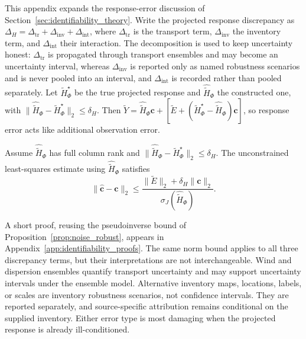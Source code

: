 This appendix expands the response-error discussion of
Section~\ref{sec:identifiability_theory}.  Write the projected
response discrepancy as
\(\Delta_H=\Delta_{\mathrm{tr}}+\Delta_{\mathrm{inv}}+\Delta_{\mathrm{int}}\),
where \(\Delta_{\mathrm{tr}}\) is the transport term, \(\Delta_{\mathrm{inv}}\)
the inventory term, and \(\Delta_{\mathrm{int}}\) their interaction.  The
decomposition is used to keep uncertainty honest: \(\Delta_{\mathrm{tr}}\) is
propagated through transport ensembles and may become an uncertainty interval,
whereas \(\Delta_{\mathrm{inv}}\) is reported only as named robustness scenarios
and is never pooled into an interval, and \(\Delta_{\mathrm{int}}\) is recorded
rather than pooled separately.  Let \(\widetilde H_\Phi^\star\) be the true
projected response and \(\widehat{\widetilde H}_\Phi\) the constructed one, with
\(\|\widehat{\widetilde H}_\Phi-\widetilde H_\Phi^\star\|_2\le\delta_H\).  Then
\(\widetilde Y=\widehat{\widetilde H}_\Phi\mathbf c
+[\widetilde E+(\widetilde H_\Phi^\star-\widehat{\widetilde H}_\Phi)\mathbf c]\),
so response error acts like additional observation error.

\begin{proposition}
\label{prop:operator_perturbation}
Assume \(\widehat{\widetilde H}_\Phi\) has full column rank and
\(\|\widehat{\widetilde H}_\Phi-\widetilde H_\Phi^\star\|_2\le\delta_H\).
The unconstrained least-squares estimate using
\(\widehat{\widetilde H}_\Phi\) satisfies
\begin{equation}
\|\widehat{\mathbf c}-\mathbf c\|_2
\le
\frac{\|\widetilde E\|_2+\delta_H\|\mathbf c\|_2}
{\sigma_J(\widehat{\widetilde H}_\Phi)}.
\label{eq:operator_error_bound}
\end{equation}
\end{proposition}

A short proof, reusing the pseudoinverse bound of
Proposition~\ref{prop:noise_robust}, appears in
Appendix~\ref{app:identifiability_proofs}.
The same norm bound applies to all three discrepancy terms, but their
interpretations are not interchangeable.  Wind and dispersion ensembles
quantify transport uncertainty and may support uncertainty intervals under the
ensemble model.  Alternative inventory maps, locations, labels, or scales are
inventory robustness scenarios, not confidence intervals.  They are reported
separately, and source-specific attribution remains conditional on the supplied
inventory.  Either error type is most damaging when the projected response is
already ill-conditioned.

